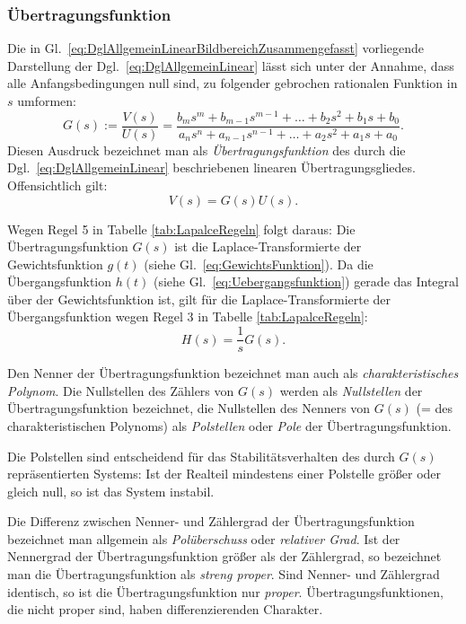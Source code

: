 \subsubsection{Übertragungsfunktion}\label{sec:gewichts-ubertr-und}
Die in Gl.~\eqref{eq:DglAllgemeinLinearBildbereichZusammengefasst} vorliegende Darstellung der Dgl.~\eqref{eq:DglAllgemeinLinear} lässt sich unter der Annahme, dass alle Anfangsbedingungen null sind, zu folgender gebrochen rationalen Funktion in $s$ umformen:
\begin{equation} \label{eq:UebertragungsfunktionAllgemein}
  G(s) := \frac{V(s)}{U(s)} = \frac{b_m s^{m} + b_{m-1} s^{m-1} + \ldots + b_2 s^2 + b_1 s + b_0}{a_n s^n + a_{n-1}s^{n-1} + \ldots + a_2 s^2 + a_1 s + a_0}.
\end{equation}
Diesen Ausdruck bezeichnet man als \emph{Übertragungsfunktion} des durch die Dgl.~\eqref{eq:DglAllgemeinLinear} beschriebenen linearen Übertragungsgliedes.
Offensichtlich gilt:
\begin{equation*}
  V(s) = G(s) U(s).
\end{equation*}
\begin{RstWichtigBox}
  Wegen Regel 5 in Tabelle \ref{tab:LapalceRegeln} folgt daraus: Die Übertragungsfunktion $G(s)$ ist die Laplace-Transformierte der Gewichtsfunktion $g(t)$ (siehe Gl.~\eqref{eq:GewichtsFunktion}).
  Da die Übergangsfunktion  $h(t)$ (siehe Gl.~\eqref{eq:Uebergangsfunktion}) gerade das Integral über der Gewichtsfunktion ist, gilt für die Laplace-Transformierte der Übergangsfunktion wegen Regel 3 in Tabelle \ref{tab:LapalceRegeln}:
  \begin{equation*}
    H(s) = \frac{1}{s}G(s).
  \end{equation*}
\end{RstWichtigBox}
\begin{RstWichtigBox}
  Den Nenner der Übertragungsfunktion bezeichnet man auch als \emph{charakteristisches Polynom}. Die Nullstellen des Zählers von $G(s)$ werden als \emph{Nullstellen} der Übertragungsfunktion bezeichnet, die Nullstellen des Nenners von $G(s)$ (= des charakteristischen Polynoms) als \emph{Polstellen} oder \emph{Pole} der Übertragungsfunktion.

  Die Polstellen sind entscheidend für das Stabilitätsverhalten des durch $G(s)$ repräsentierten Systems: Ist der Realteil mindestens einer Polstelle größer oder gleich null, so ist das System instabil.

  Die Differenz zwischen Nenner- und Zählergrad der Übertragungsfunktion bezeichnet man allgemein als \emph{Polüberschuss} oder \emph{relativer Grad}. Ist der Nennergrad der Übertragungsfunktion größer als der Zählergrad, so bezeichnet man die Übertragungsfunktion als \emph{streng proper}. Sind Nenner- und Zählergrad identisch, so ist die Übertragungsfunktion nur \emph{proper}. Übertragungsfunktionen, die nicht proper sind, haben differenzierenden Charakter.
\end{RstWichtigBox}

